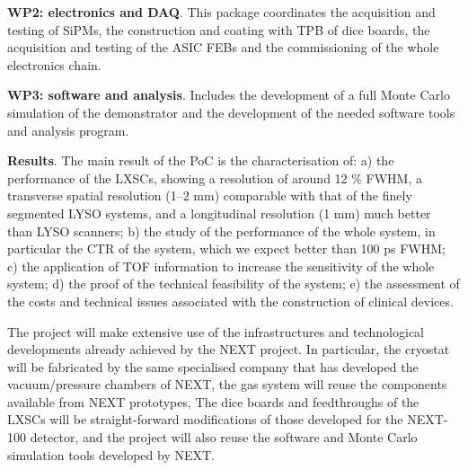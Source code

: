 \documentclass[11pt,a4paper]{article}
\begin{document}
{\bf WP2: electronics and DAQ}. This package coordinates the acquisition and testing of SiPMs, the construction and coating with TPB of dice boards, the acquisition and testing of the ASIC FEBs and the commissioning of the whole electronics chain. 

{\bf WP3: software and analysis}. Includes the development of a full Monte Carlo simulation of the demonstrator and the development of the needed software tools and analysis program. 

{\bf Results}. The main result of the PoC is the characterisation of: a) the performance of the LXSCs, showing a resolution of around 12 \% FWHM, a transverse spatial resolution (1--2 mm) comparable with that of the finely segmented LYSO systems, and a longitudinal resolution (1 mm) much better than LYSO scanners; b) the study of the performance of the whole system, in particular the CTR of the system, which we expect better than 100 ps FWHM; c) the application of TOF information to increase the sensitivity of the whole system; d) the proof of the technical feasibility of the system; e) the assessment of the costs and technical issues associated with the construction of clinical devices. 

The project will make extensive use of the infrastructures and technological developments already achieved by the NEXT project. In particular, the cryostat will be fabricated by the same specialised company that has developed the vacuum/pressure chambers of NEXT, the gas system will reuse the components available from NEXT prototypes, The dice boards and feedthroughs of the LXSCs will be straight-forward modifications of those developed for the NEXT-100 detector, and the project will also reuse the software and Monte Carlo simulation tools developed by NEXT. 
\end{document}
